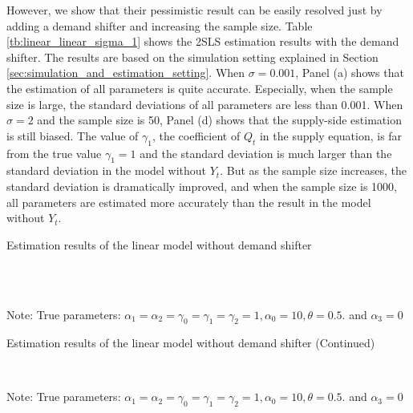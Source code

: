 \documentclass[11pt, a4paper]{article}
\begin{document}
However, we show that their pessimistic result can be easily resolved just by adding a demand shifter and increasing the sample size.
Table \ref{tb:linear_linear_sigma_1} shows the 2SLS estimation results with the demand shifter.
The results are based on the simulation setting explained in Section \ref{sec:simulation_and_estimation_setting}.
When $\sigma = 0.001$, Panel (a) shows that the estimation of all parameters is quite accurate.
Especially, when the sample size is large, the standard deviations of all parameters are less than 0.001.
When $\sigma = 2$ and the sample size is 50, Panel (d) shows that the supply-side estimation is still biased.
The value of $\gamma_1$, the coefficient of $Q_t$ in the supply equation, is far from the true value $\gamma_1 = 1$ and the standard deviation is much larger than the standard deviation in the model without $Y_t$.
But as the sample size increases, the standard deviation is dramatically improved, and when the sample size is 1000, all parameters are estimated more accurately than the result in the model without $Y_t$.

\begin{table}[!htbp]
  \begin{center}
      \caption{Estimation results of the linear model without demand shifter}
      \label{tb:linear_linear_sigma_1_without_demand_shifter_y} 
      \subfloat[$\sigma=0.001$]{}\\
      \subfloat[$\sigma=0.5$]{}\\
  \end{center}\footnotesize
  Note: True parameters: $\alpha_1 = \alpha_2 =  \gamma_0 = \gamma_1 = \gamma_2  =  1, \alpha_0 = 10, \theta = 0.5.$ and $\alpha_3 =0$
\end{table} 

\begin{table}[!htbp]
  \ContinuedFloat  %
  \begin{center}
      \caption{Estimation results of the linear model without demand shifter (Continued)}
      \label{tb:linear_linear_sigma_1_without_demand_shifter_y} 
      \subfloat[$\sigma=1.0$]{}\\
    \subfloat[$\sigma=2.0$]{}
  \end{center}\footnotesize
  Note: True parameters: $\alpha_1 = \alpha_2 =  \gamma_0 = \gamma_1 = \gamma_2  =  1, \alpha_0 = 10, \theta = 0.5.$ and $\alpha_3 =0$
\end{table} 
\end{document}
